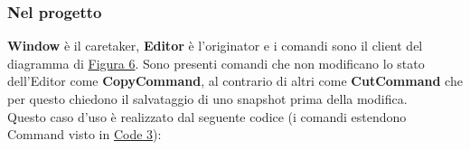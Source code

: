 \documentclass[12pt]{article}
\begin{document}
\subsubsection{Nel progetto}
\textbf{Window} è il caretaker, \textbf{Editor} è l'originator e i comandi sono il client del diagramma di \hyperref[fig:mementoPattern]{Figura 6}. Sono presenti comandi che non modificano lo stato dell'Editor come \textbf{CopyCommand}, al contrario di altri come \textbf{CutCommand} che per questo chiedono il salvataggio di uno snapshot prima della modifica.\\
Questo caso d'uso è realizzato dal seguente codice (i comandi estendono Command visto in \hyperref[lst:Command.java]{Code 3}):\\
\begin{minipage}{\textwidth}

\end{minipage}
\begin{minipage}{\textwidth}

\end{minipage}
\begin{minipage}{\textwidth}

\end{minipage}
\begin{minipage}{\textwidth}

\end{minipage}
\end{document}
